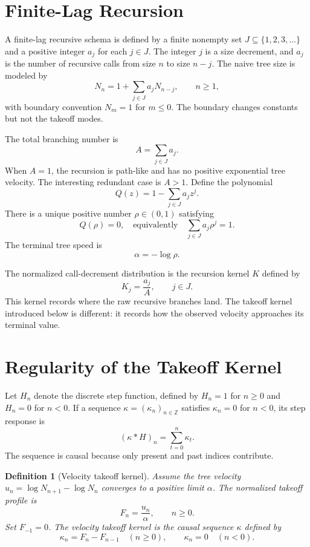 \documentclass[10pt,twocolumn]{article}
\newtheorem{definition}{Definition}
\begin{document}
\section{Finite-Lag Recursion}

A finite-lag recursive schema is defined by a finite nonempty set \(J\subseteq\{1,2,3,\ldots\}\) and a positive integer \(a_j\) for each \(j\in J\).  The integer \(j\) is a size decrement, and \(a_j\) is the number of recursive calls from size \(n\) to size \(n-j\).  The naive tree size is modeled by
\begin{equation}\label{eq:tree}
        N_n
        =
        1+\sum_{j\in J}a_jN_{n-j},
        \qquad n\ge 1,
\end{equation}
with boundary convention \(N_m=1\) for \(m\le 0\).  The boundary changes constants but not the takeoff modes.

The total branching number is
\[
        A=\sum_{j\in J}a_j.
\]
When \(A=1\), the recursion is path-like and has no positive exponential tree velocity.  The interesting redundant case is \(A>1\).  Define the polynomial
\[
        Q(z)=1-\sum_{j\in J}a_jz^j.
\]
There is a unique positive number \(\rho\in(0,1)\) satisfying
\begin{equation}\label{eq:rho}
        Q(\rho)=0,
        \quad\text{equivalently}\quad
        \sum_{j\in J}a_j\rho^j=1.
\end{equation}
The terminal tree speed is
\[
        \alpha=-\log \rho.
\]

The normalized call-decrement distribution is the recursion kernel \(K\) defined by
\[
        K_j=\frac{a_j}{A},
        \qquad j\in J.
\]
This kernel records where the raw recursive branches land.  The takeoff kernel introduced below is different: it records how the observed velocity approaches its terminal value.

\section{Regularity of the Takeoff Kernel}

Let \(H_n\) denote the discrete step function, defined by \(H_n=1\) for \(n\ge 0\) and \(H_n=0\) for \(n<0\).  If a sequence \(\kappa=(\kappa_n)_{n\in\mathbb{Z}}\) satisfies \(\kappa_n=0\) for \(n<0\), its step response is
\[
        (\kappa * H)_n=\sum_{t=0}^{n}\kappa_t.
\]
The sequence is causal because only present and past indices contribute.

\begin{definition}[Velocity takeoff kernel]
Assume the tree velocity \(u_n=\log N_{n+1}-\log N_n\) converges to a positive limit \(\alpha\).  The normalized takeoff profile is
\[
        F_n=\frac{u_n}{\alpha},
        \qquad n\ge 0.
\]
Set \(F_{-1}=0\).  The velocity takeoff kernel is the causal sequence \(\kappa\) defined by
\[
        \kappa_n=F_n-F_{n-1}\quad(n\ge 0),
        \qquad
        \kappa_n=0\quad(n<0).
\]
\end{definition}
\end{document}
